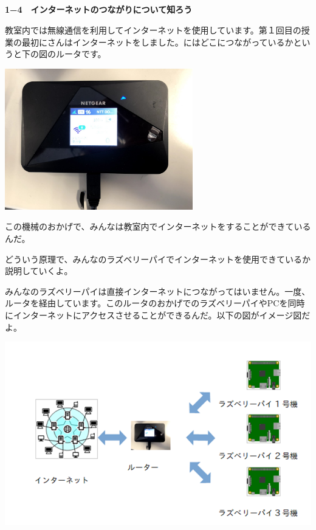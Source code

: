 \documentclass[a4paper,12pt,dvipdfmx]{jarticle}
\begin{document}
\flushleft


\subsection*{\bfseries }
\clearpage
\textbf{1−4　インターネットのつながりについて知ろう}

教室内では無線通信を利用してインターネットを使用しています。第１回目の授業の最初にさんはインターネットをしました。にはどこにつながっているかというと下の図のルータです。

\centering
\includegraphics[width=8.186cm]{ome7-img011.png}
\flushleft


\bigskip


\bigskip


\bigskip


\bigskip


\bigskip


\bigskip


\bigskip

この機械のおかげで、みんなは教室内でインターネットをすることができているんだ。

どういう原理で、みんなのラズベリーパイでインターネットを使用できているか説明していくよ。

みんなのラズベリーパイは直接インターネットにつながってはいません。一度、ルータを経由しています。このルータのおかげでのラズベリーパイやPCを同時にインターネットにアクセスさせることができるんだ。以下の図がイメージ図だよ。


\bigskip



\centering
\includegraphics[width=\textwidth]{ome7-img012.png}
\flushleft
\end{document}
